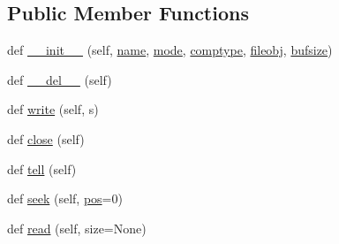 \subsection*{Public Member Functions}
\begin{DoxyCompactItemize}
\item 
def \hyperlink{classpip_1_1__vendor_1_1distlib_1_1__backport_1_1tarfile_1_1__Stream_a17492c93bae9e70b816bffb077cf2912}{\+\_\+\+\_\+init\+\_\+\+\_\+} (self, \hyperlink{classpip_1_1__vendor_1_1distlib_1_1__backport_1_1tarfile_1_1__Stream_a18575350de61928a7f7a267b81c9cce9}{name}, \hyperlink{classpip_1_1__vendor_1_1distlib_1_1__backport_1_1tarfile_1_1__Stream_a801112e1cc33547b52200ac627e0b4b8}{mode}, \hyperlink{classpip_1_1__vendor_1_1distlib_1_1__backport_1_1tarfile_1_1__Stream_ad4cb03b7c25f50b7ec029150bd9c59b4}{comptype}, \hyperlink{classpip_1_1__vendor_1_1distlib_1_1__backport_1_1tarfile_1_1__Stream_a27df5d122e6c38b5bfb33a7d1a4a814e}{fileobj}, \hyperlink{classpip_1_1__vendor_1_1distlib_1_1__backport_1_1tarfile_1_1__Stream_a9c0a6c7a231cbac3394f9e443eca1b34}{bufsize})
\item 
def \hyperlink{classpip_1_1__vendor_1_1distlib_1_1__backport_1_1tarfile_1_1__Stream_acc211b52c05d61db562ecadfcf63bad9}{\+\_\+\+\_\+del\+\_\+\+\_\+} (self)
\item 
def \hyperlink{classpip_1_1__vendor_1_1distlib_1_1__backport_1_1tarfile_1_1__Stream_a3ebea1d0fcb9691f64a02aa2ad1edd88}{write} (self, s)
\item 
def \hyperlink{classpip_1_1__vendor_1_1distlib_1_1__backport_1_1tarfile_1_1__Stream_a1a25d16c23451063ba92b17584a36535}{close} (self)
\item 
def \hyperlink{classpip_1_1__vendor_1_1distlib_1_1__backport_1_1tarfile_1_1__Stream_a7ac63395858d58d97a4ea8bc0ee0e77c}{tell} (self)
\item 
def \hyperlink{classpip_1_1__vendor_1_1distlib_1_1__backport_1_1tarfile_1_1__Stream_a6a3fe71df75c4dde3115d48570341ef1}{seek} (self, \hyperlink{classpip_1_1__vendor_1_1distlib_1_1__backport_1_1tarfile_1_1__Stream_a7abc9d0e37a25b571c5b2bc3a2e42658}{pos}=0)
\item 
def \hyperlink{classpip_1_1__vendor_1_1distlib_1_1__backport_1_1tarfile_1_1__Stream_abaf3986e16734dc5f6c18e69abd21ee1}{read} (self, size=None)
\end{DoxyCompactItemize}
